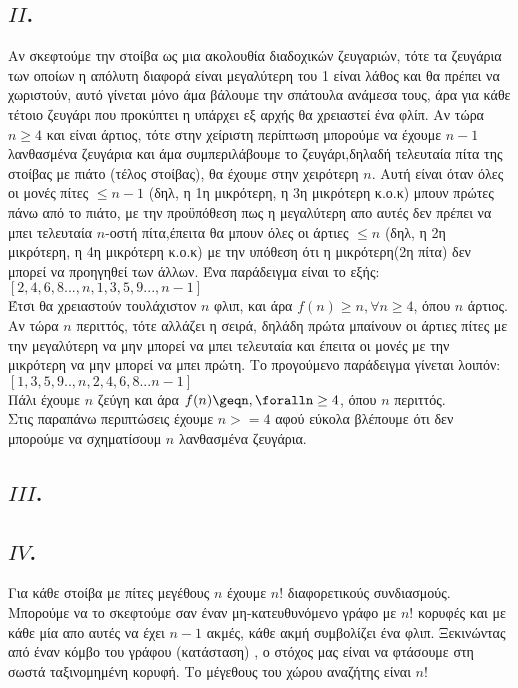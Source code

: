 \documentclass[14pt,fleqn]{extarticle}
\begin{document}
\begin{adjustwidth}{2em}{0pt}
\subsection*{$II$.}
\begin{adjustwidth}{3em}{0pt}
Αν σκεφτούμε την στοίβα ως μια ακολουθία διαδοχικών ζευγαριών, τότε τα ζευγάρια των οποίων η απόλυτη διαφορά είναι μεγαλύτερη του 1 είναι λάθος και θα πρέπει να χωριστούν, αυτό γίνεται μόνο άμα βάλουμε την σπάτουλα ανάμεσα τους, άρα για κάθε τέτοιο ζευγάρι που προκύπτει η υπάρχει εξ αρχής θα χρειαστεί ένα φλίπ. Αν τώρα $n\geq4$ και είναι άρτιος, τότε στην χείριστη περίπτωση μπορούμε να έχουμε $n-1$ λανθασμένα ζευγάρια και άμα συμπεριλάβουμε το ζευγάρι,δηλαδή τελευταία πίτα της στοίβας με πιάτο (τέλος στοίβας), θα έχουμε στην χειρότερη $n$. Αυτή είναι όταν όλες οι μονές πίτες $\leq n-1$ (δηλ, η 1η μικρότερη, η 3η μικρότερη κ.ο.κ) μπουν πρώτες πάνω από το πιάτο, με την προϋπόθεση πως η μεγαλύτερη απο αυτές δεν πρέπει να μπει τελευταία $n$-οστή πίτα,έπειτα θα μπουν όλες οι άρτιες $\leq n$ (δηλ, η 2η μικρότερη, η 4η μικρότερη κ.ο.κ) με την υπόθεση ότι η μικρότερη(2η πίτα) δεν μπορεί να προηγηθεί των άλλων. Ένα παράδειγμα είναι το εξής:\\[7pt]
$[2,4,6,8...,n,1,3,5,9...,n-1]$\\[7pt]Έτσι θα χρειαστούν τουλάχιστον $n$ φλιπ, και άρα  $f(n)\geq n,  \forall n\geq4$, όπου  $n$ άρτιος.
\newpage
Αν τώρα $n$ περιττός, τότε αλλάζει η σειρά, δηλάδη πρώτα μπαίνουν οι άρτιες πίτες με την μεγαλύτερη να μην μπορεί να μπει τελευταία και έπειτα οι μονές με την μικρότερη να μην μπορεί να μπει πρώτη. Το προγούμενο παράδειγμα γίνεται λοιπόν:\\[7pt]
$[1,3,5,9..,n,2,4,6,8...n-1]$\\[7pt]Πάλι έχουμε $n$  ζεύγη και άρα $f(n)\geqn,\foralln\geq4$, όπου $n$ περιττός.\\
Στις παραπάνω περιπτώσεις έχουμε $n>=4$ αφού εύκολα βλέπουμε ότι δεν μπορούμε να σχηματίσουμ $n$ λανθασμένα ζευγάρια.
\end{adjustwidth}
\subsection*{$III$.}
\begin{adjustwidth}{3em}{0pt}
\end{adjustwidth}
\subsection*{$IV$.}
Για κάθε στοίβα με πίτες μεγέθους $n$ έχουμε $n!$ διαφορετικούς συνδιασμούς. Μπορούμε να το σκεφτούμε σαν έναν μη-κατευθυνόμενο γράφο με $n!$ κορυφές και με κάθε μία απο αυτές να έχει $n-1$ ακμές, κάθε ακμή συμβολίζει ένα φλιπ. Ξεκινώντας από έναν κόμβο του γράφου (κατάσταση) , ο στόχος μας είναι να φτάσουμε στη σωστά ταξινομημένη κορυφή. Το μέγεθους του χώρου αναζήτης είναι $n!$
\end{adjustwidth}
\end{document}
